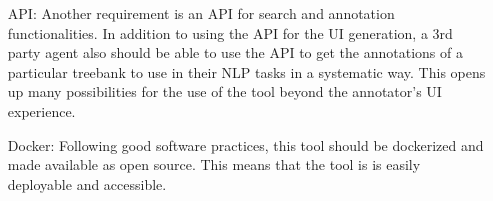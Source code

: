 \begin{itemize}[before=\normalfont, font=\itshape, align=left]
\item[API:]
Another requirement is an API for search and annotation functionalities.
In addition to using the API for the UI generation, a 3rd party agent also should be able to use the API to get the annotations of a particular treebank to use in their NLP tasks in a systematic way.
This opens up many possibilities for the use of the tool beyond the annotator's UI experience.

\item[Docker:]
Following good software practices, this tool should be dockerized and made available as open source.
This means that the tool is is easily deployable and accessible.
\end{itemize}
